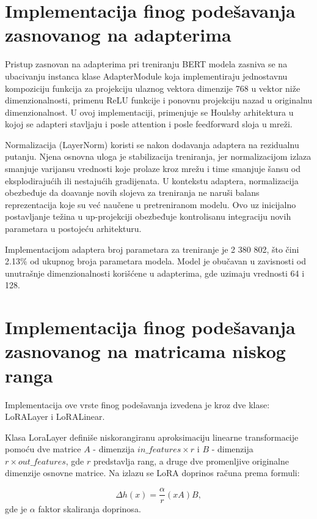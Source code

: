 \documentclass[12pt,oneside]{memoir}
\begin{document}
\section{Implementacija finog podešavanja zasnovanog na adapterima}

Pristup zasnovan na adapterima pri treniranju BERT modela zasniva se na ubacivanju instanca klase AdapterModule koja implementiraju jednostavnu kompoziciju  funkcija za projekciju ulaznog vektora dimenzije 768 u vektor niže dimenzionalnosti, primenu ReLU funkcije i ponovnu projekciju nazad u originalnu dimenzionalnost. U ovoj implementaciji, primenjuje se Houlsby arhitektura u kojoj se adapteri stavljaju i posle attention i posle feedforward sloja u mreži.

Normalizacija (LayerNorm) koristi se nakon dodavanja adaptera na rezidualnu putanju. Njena osnovna uloga je stabilizacija treniranja, jer normalizacijom izlaza smanjuje varijansu vrednosti koje prolaze kroz mrežu i time smanjuje šansu od eksplodirajućih ili nestajućih gradijenata. U kontekstu adaptera, normalizacija obezbeđuje da doavanje novih slojeva za treniranja ne naruši balans reprezentacija koje su već naučene u pretreniranom modelu. Ovo uz inicijalno postavljanje težina u up-projekciji obezbeđuje kontrolisanu integraciju novih parametara u postojeću arhitekturu.

Implementacijom adaptera broj parametara za treniranje je 2 380 802, što čini 2.13\% od ukupnog broja parametara modela. Model je obučavan u zavisnosti od unutrašnje dimenzionalnosti korišćene u adapterima, gde uzimaju vrednosti 64 i 128.

\section{Implementacija finog podešavanja zasnovanog na matricama niskog ranga}
Implementacija ove vrste finog podešavanja izvedena je kroz dve klase: LoRALayer i LoRALinear.

Klasa LoraLayer definiše niskorangiranu aproksimaciju linearne transformacije pomoću dve matrice $A$ - dimenzija \(in\_features \times r\) i $B$ - dimenzija \(r \times out\_features\), gde $r$  predstavlja rang, a druge dve promenljive originalne dimenzije osnovne matrice. Na izlazu se LoRA doprinos računa prema formuli:

\begin{equation}
	\Delta h(x) = \frac{\alpha}{r} (xA)B,
\end{equation}
gde je \(\alpha\) faktor skaliranja doprinosa. 
\end{document}
